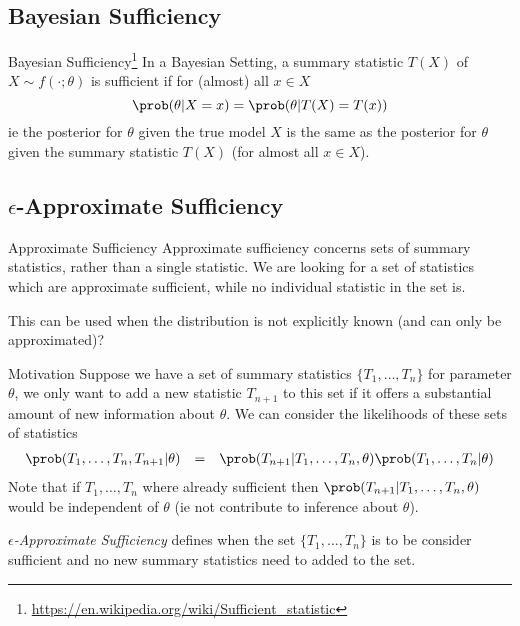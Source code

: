 \documentclass[11pt,a4paper]{article}
\begin{document}
\subsection*{Bayesian Sufficiency}

  \begin{definition}{Bayesian Sufficiency\footnote{\url{https://en.wikipedia.org/wiki/Sufficient_statistic}}}
    In a Bayesian Setting, a summary statistic $T(X)$ of $X\sim f(\cdot;\theta)$ is sufficient if for (almost) all $x\in X$
    \[ \prob(\theta|X=x)=\prob(\theta|T(X)=T(x)) \]
    ie the posterior for $\theta$ given the true model $X$ is the same as the posterior for $\theta$ given the summary statistic $T(X)$ (for almost all $x\in X$).
  \end{definition}

\subsection*{$\epsilon$-Approximate Sufficiency}

  \begin{remark}{Approximate Sufficiency}
    Approximate sufficiency concerns sets of summary statistics, rather than a single statistic. We are looking for a set of statistics which are approximate sufficient, while no individual statistic in the set is.
    \par This can be used when the distribution is not explicitly known (and can only be approximated)?
  \end{remark}

  \begin{remark}{Motivation}
    Suppose we have a set of summary statistics $\{T_1,\dots,T_n\}$ for parameter $\theta$, we only want to add a new statistic $T_{n+1}$ to this set if it offers a substantial amount of new information about $\theta$. We can consider the likelihoods of these sets of statistics
    \[\begin{array}{rcl}
      \prob(T_1,\dots,T_n,T_{n+1}|\theta)&=&\prob(T_{n+1}|T_1,\dots,T_n,\theta)\prob(T_1,\dots,T_n|\theta)
    \end{array}\]
    Note that if $T_1,\dots,T_n$ where already sufficient then $\prob(T_{n+1}|T_1,\dots,T_n,\theta)$ would be independent of $\theta$ (ie not contribute to inference about $\theta$).
    \par \textit{$\epsilon$-Approximate Sufficiency} defines when the set $\{T_1,\dots,T_n\}$ is to be consider sufficient and no new summary statistics need to added to the set.
  \end{remark}
\end{document}
